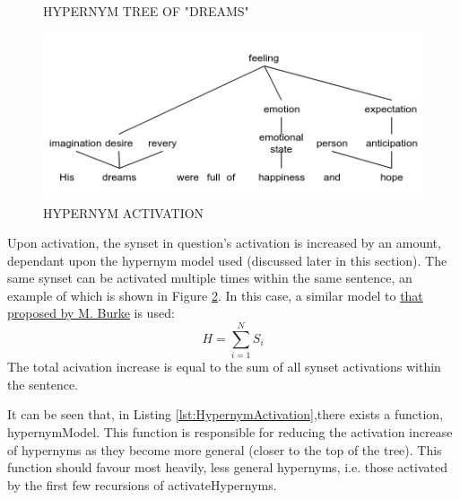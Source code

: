 \documentclass[]{article}
\begin{document}
\begin{figure}[h]
\caption{HYPERNYM TREE OF "DREAMS"}
\label{fig:hypernymTree}
\end{figure}

\begin{figure}[h]
	\includegraphics[scale=0.6]{HypernymActivation.png}
	\caption{HYPERNYM ACTIVATION}
	\label{fig:HypernymAct}
\end{figure}

Upon activation, the synset in question's activation is increased by an amount, dependant upon the hypernym model used (discussed later in this section). The same synset can be activated multiple times within the same sentence, an example of which is shown in Figure \ref{fig:HypernymAct}. In this case, a similar model to \hyperref[sec:MattBurke]{that proposed by M. Burke} \cite{MattBurkePrevious} is used: 
\[H = \sum\limits_{i=1}^N S_i\] 
The total acivation increase is equal to the sum of all synset activations within the sentence. 

It can be seen that, in Listing \ref{lst:HypernymActivation},there exists a function, hypernymModel. This function is responsible for reducing the activation increase of hypernyms as they become more general (closer to the top of the tree). This function should favour most heavily, less general hypernyms, i.e. those activated by the first few recursions of activateHypernyms. 
\end{document}
